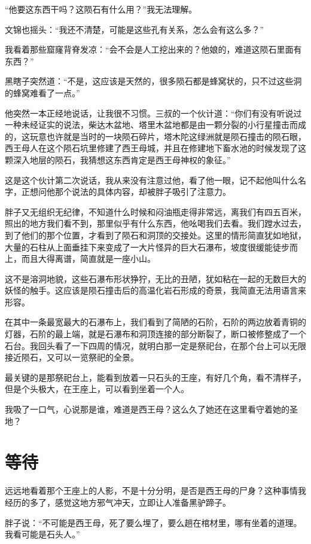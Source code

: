 “他要这东西干吗？这陨石有什么用？”我无法理解。

文锦也摇头：“我还不清楚，可能是这些孔有关系，怎么会有这么多？”

我看着那些窟窿背脊发凉：“会不会是人工挖出来的？他娘的，难道这陨石里面有东西？”

黑瞎子突然道：“不是，这应该是天然的，很多陨石都是蜂窝状的，只不过这些洞的蜂窝难看了一点。”

他突然一本正经地说话，让我很不习惯。三叔的一个伙计道：“你们有没有听说过一种未经证实的说法，柴达木盆地、塔里木盆地都是由一颗分裂的小行星撞击而成的，这玩意也许就是当时的一块陨石碎片，塔木陀这绿洲就是陨石撞击的陨石眼，西王母人在这个陨石坑里修建了西王母城，并且在修建地下畜水池的时候发现了这颗深入地层的陨石，我猜想这东西肯定是西王母神权的象征。”

这是这个伙计第二次说话，我从来没有注意过他，看了他一眼，记不起他叫什么名字，正想问他那个说法的具体内容，却被胖子吸引了注意力。

胖子又无组织无纪律，不知道什么时候和闷油瓶走得非常远，离我们有四五百米，照出的地方我们看不到，那里似乎有什么东西，他吆喝我们去看。我们蹚水过去，到了他们的那个位置，才看到了陨石和洞顶的交接处。这里的情形简直犹如地狱，大量的石柱从上面垂挂下来变成了一大片怪异的巨大石瀑布，坡度很缓能徒步而上，而且大得离谱，简直就是一座小山。

这不是溶洞地貌，这些石瀑布形状狰狞，无比的丑陋，犹如粘在一起的无数巨大的妖怪的触手。这应该是陨石撞击后的高温化岩石形成的奇景，我简直无法用语言来形容。

在其中一条最宽最大的石瀑布上，我们看到了简陋的石阶，石阶的两边放着青铜的灯器，石阶的最上端，就是石瀑布和洞顶连接的部分断裂了，断口被修整成了一个石台。我回头看了一下四周的情况，就明白那一定是祭祀台，在那个台上可以无限接近陨石，又可以一览祭祀的全景。

最关键的是那祭祀台上，能看到放着一只石头的王座，有好几个角，看不清样子，但是个头极大，在王座上，可以看到坐着一个人。

我吸了一口气，心说那是谁，难道是西王母？这么久了她还在这里看守着她的圣地？

\chapter{等待}

远远地看着那个王座上的人影，不是十分分明，是否是西王母的尸身？这种事情我经历的多了，感觉这地方邪气冲天，立即让人准备黑驴蹄子。

胖子说：“不可能是西王母，死了要么埋了，要么趟在棺材里，哪有坐着的道理。我看可能是石头人。”

